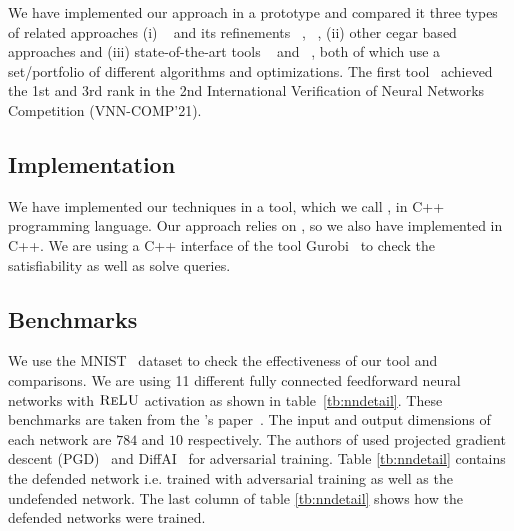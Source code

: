 We have implemented our approach in a prototype and compared it three types of related approaches (i) \deeppoly{}~\cite{singh2019abstract} and its refinements \kpoly{}~\cite{singh2019beyond}, \deepsrgr{}~\cite{yang2021improving}, (ii) other cegar based approaches and 
(iii) state-of-the-art tools \alphabeta~\cite{zhang2018efficient,wang2021beta,xu2020fast,zhang2022branch,tjeng2017evaluating} and 
\ovaltool~\cite{bunel2018unified,bunel2020branch,bunel2020lagrangian,de2021scaling,de2021scaling,de2021scaling2,de2021improved}, both of which use a set/portfolio of different algorithms and optimizations. The first tool~\alphabeta{} achieved the 1st and \ovaltool{} 3rd rank in the 2nd International Verification of Neural Networks Competition (VNN-COMP'21).
\subsection{Implementation}
We have implemented our techniques in a tool, which we call \drefine{}, in \textsc{C++} programming language. Our approach relies on \deeppoly{}, so we also have implemented \deeppoly{} in \textsc{C++}. We are using a \textsc{C++} interface of the tool Gurobi~\cite{gurobioptimizer} to check the satisfiability as well as solve  \maxsat{} queries. %

\subsection{Benchmarks}
We use the MNIST~\cite{deng2012mnist} dataset to check the effectiveness of our tool and comparisons. We are using 11 different fully connected feedforward neural networks with $\textsc{ReLU}${} activation as shown in table~\ref{tb:nndetail}.
These benchmarks are taken from the \deeppoly{}'s paper~\cite{singh2019abstract}.  The input and output dimensions of each network are $784$ and $10$ respectively. 
The authors of \deeppoly{} used projected gradient descent (PGD)~\cite{dong2018boosting}
and DiffAI~\cite{mirman2018differentiable} for adversarial training. Table \ref{tb:nndetail} contains the defended network i.e.
trained with adversarial training as well as the undefended network. The last column of table \ref{tb:nndetail} shows how the defended networks were trained.  

